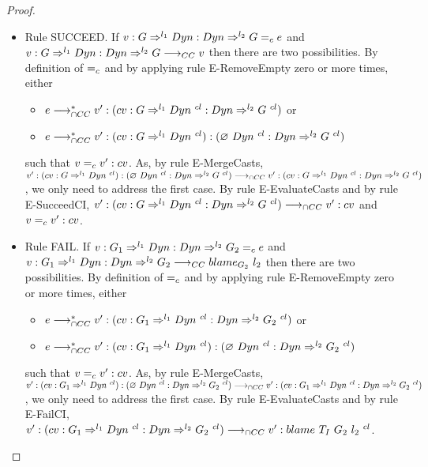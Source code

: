 \documentclass[a4paper]{article}
\begin{document}
\begin{proof}
\begin{itemize}
\begin{itemize}
        \item Rule SUCCEED.
        If $v : G \Rightarrow^{l_1} Dyn : Dyn \Rightarrow^{l_2} G =_c e$ and $v : G \Rightarrow^{l_1} Dyn : Dyn \Rightarrow^{l_2} G \longrightarrow_{CC} v$ then there are two possibilities.
        By definition of $=_c$ and by applying rule E-RemoveEmpty zero or more times, either
        \begin{itemize}
            \item $e \longrightarrow_{\cap CC}^* v' : (cv : G \Rightarrow^{l_1} Dyn\ ^{cl} : Dyn \Rightarrow^{l_2} G\ ^{cl})$ or
            \item $e \longrightarrow_{\cap CC}^* v' : (cv : G \Rightarrow^{l_1} Dyn\ ^{cl}) : (\varnothing\ Dyn\ ^{cl} : Dyn \Rightarrow^{l_2} G\ ^{cl})$
        \end{itemize}
        such that $v =_c v' : cv$.
        As, by rule E-MergeCasts, $v' : (cv : G \Rightarrow^{l_1} \Dyn\ ^{cl}) : (\emptycast{\Dyn}{cl} : \Dyn \Rightarrow^{l_2} G\ ^{cl}) \gios v' : (cv : G \Rightarrow^{l_1} \Dyn\ ^{cl} : \Dyn \Rightarrow^{l_2} G\ ^{cl})$, we only need to address the first case.
        By rule E-EvaluateCasts and by rule E-SucceedCI, $v' : (cv : G \Rightarrow^{l_1} Dyn\ ^{cl} : Dyn \Rightarrow^{l_2} G\ ^{cl}) \longrightarrow_{\cap CC} v' : cv$ and $v =_c v' : cv$.
        \item Rule FAIL.
        If $v : G_1 \Rightarrow^{l_1} Dyn : Dyn \Rightarrow^{l_2} G_2 =_c e$ and $v : G_1 \Rightarrow^{l_1} Dyn : Dyn \Rightarrow^{l_2} G_2 \longrightarrow_{CC} blame_{G_2}\ l_2$ then there are two possibilities.
        By definition of $=_c$ and by applying rule E-RemoveEmpty zero or more times, either
        \begin{itemize}
            \item $e \gios^* v' : (cv : G_1 \Rightarrow^{l_1} \Dyn\ ^{cl} : \Dyn \Rightarrow^{l_2} G_2\ ^{cl})$ or
            \item $e \longrightarrow_{\cap CC}^* v' : (cv : G_1 \Rightarrow^{l_1} Dyn\ ^{cl}) : (\varnothing\ Dyn\ ^{cl} : Dyn \Rightarrow^{l_2} G_2\ ^{cl})$
        \end{itemize}
        such that $v =_c v' : cv$.
        As, by rule E-MergeCasts, $v' : (cv : G_1 \Rightarrow^{l_1} Dyn\ ^{cl}) : (\varnothing\ Dyn\ ^{cl} : Dyn \Rightarrow^{l_2} G_2\ ^{cl}) \longrightarrow_{\cap CC} v' : (cv : G_1 \Rightarrow^{l_1} Dyn\ ^{cl} : Dyn \Rightarrow^{l_2} G_2\ ^{cl})$, we only need to address the first case.
        By rule E-EvaluateCasts and by rule E-FailCI, $v' : (cv : G_1 \Rightarrow^{l_1} Dyn\ ^{cl} : Dyn \Rightarrow^{l_2} G_2\ ^{cl}) \longrightarrow_{\cap CC} v' : blame\ T_I\ G_2\ l_2\ ^{cl}$.

\end{itemize}
\end{itemize}
\end{proof}
\end{document}
